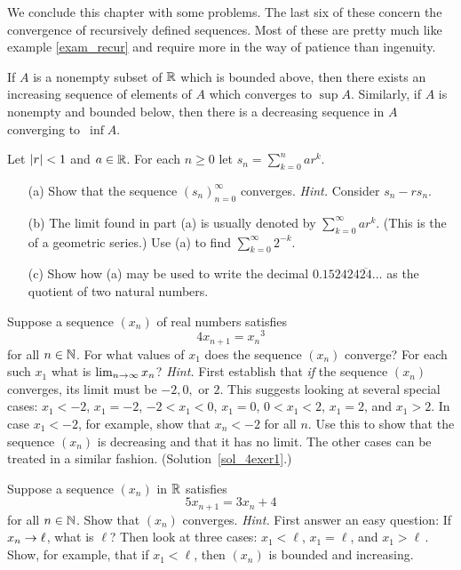 We conclude this chapter with some problems.  The last six of these concern the convergence of
recursively defined sequences.  Most of these are pretty much like example \ref{exam_recur}
and require more in the way of patience than ingenuity.

\begin{prob} If $A$ is a nonempty subset of $\mathbb{R}$ which is bounded above, then there exists an
increasing sequence of elements of $A$ which converges to $\sup A$.  Similarly, if $A$ is
nonempty and bounded below, then there is a decreasing sequence in $A$ converging to~$\inf A$.
\end{prob}

\begin{prob} Let $\lvert r\rvert < 1$ and $a \in \mathbb{R}$. For each $n \ge 0$ let
$s_n = \sum_{k=0}^n ar^k$.
 \begin{enumerate}
  \item[(a)] Show that the sequence $(s_n)_{n=0}^\infty$ converges. \emph{Hint.}  Consider $s_n - rs_n$.
  \item[(b)] The limit found in part (a) is usually denoted by $\sum_{k=0}^\infty ar^k$. (This is the
 of a geometric series.)  Use (a) to find $\sum_{k=0}^\infty 2^{-k}$.
  \item[(c)] Show how (a) may be used to write the decimal $0.152424\overline{24}\dots$ as the
quotient of two natural numbers.
 \end{enumerate}
\end{prob}

\begin{exer}\label{4exer1} Suppose a sequence $(x_n)$ of real numbers satisfies
   \[ 4 x_{n+1} = {x_n}^3 \]
for all $n \in \mathbb{N}$.  For what values of $x_1$ does the sequence $(x_n)$ converge? For each
such $x_1$ what is $\lim_{n \rightarrow \infty} x_n$? \emph{Hint.}  First establish that \emph{if}
the sequence $(x_n)$ converges, its limit must be $-2 ,0 ,\text{ or } 2$. This suggests
looking at several special cases: $x_1 < -2$, $x_1 = -2$, $-2 < x_1 < 0$, $x_1 = 0$, $0 < x_1
< 2$, $x_1 = 2$, and $x_1 > 2$. In case  $x_1 < -2$, for example, show that $x_n < -2$ for all
$n$. Use this to show that the sequence $(x_n)$ is decreasing and that it has no limit.  The
other cases can be treated in a similar fashion. (Solution~\ref{sol_4exer1}.)
\end{exer}

\begin{prob} Suppose a sequence $(x_n)$ in $\mathbb{R}$ satisfies
   \[ 5x_{n+1} = 3x_n + 4 \]
for all $n \in \mathbb{N}$. Show that $(x_n)$ converges. \emph{Hint.} First answer an easy question:
If $x_n \rightarrow \ell$, what is $\ell$? Then look at three cases: $x_1 < \ell$, $x_1 = \ell$, and
$x_1 > \ell\,{}$. Show, for example, that if $x_1 < \ell$, then $(x_n)$ is bounded and
increasing.
\end{prob}

